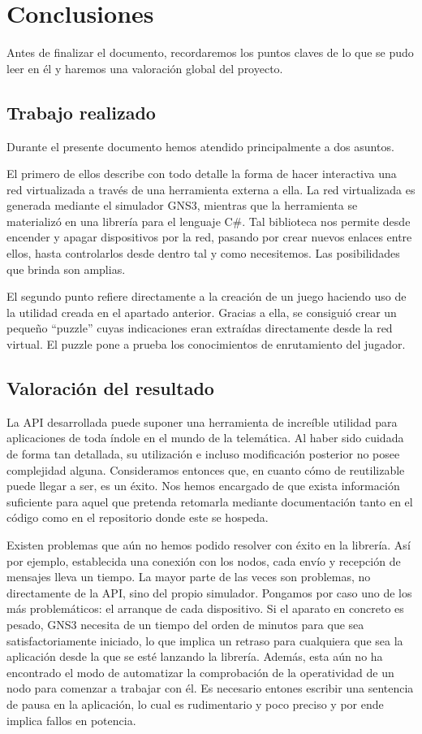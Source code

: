 \chapter{Conclusiones}\label{chap:Conclusiones}
Antes de finalizar el documento, recordaremos los puntos claves de lo que se pudo leer en él y haremos una valoración global del proyecto.

\section{Trabajo realizado}
Durante el presente documento hemos atendido principalmente a dos asuntos.

El primero de ellos describe con todo detalle la forma de hacer interactiva una red virtualizada a través de una herramienta externa a ella. La red virtualizada es generada mediante el simulador GNS3, mientras que la herramienta se materializó en una librería para el lenguaje C\#. Tal biblioteca nos permite desde encender y apagar dispositivos por la red, pasando por crear nuevos enlaces entre ellos, hasta controlarlos desde dentro tal y como necesitemos. Las posibilidades que brinda son amplias.

El segundo punto refiere directamente a la creación de un juego haciendo uso de la utilidad creada en el apartado anterior. Gracias a ella, se consiguió crear un pequeño ``puzzle'' cuyas indicaciones eran extraídas directamente desde la red virtual. El puzzle pone a prueba los conocimientos de enrutamiento del jugador.

\section{Valoración del resultado}
La API desarrollada puede suponer una herramienta de increíble utilidad para aplicaciones de toda índole en el mundo de la telemática. Al haber sido cuidada de forma tan detallada, su utilización e incluso modificación posterior no posee complejidad alguna. Consideramos entonces que, en cuanto cómo de reutilizable puede llegar a ser, es un éxito. Nos hemos encargado de que exista información suficiente para aquel que pretenda retomarla mediante documentación tanto en el código como en el repositorio donde este se hospeda.

Existen problemas que aún no hemos podido resolver con éxito en la librería. Así por ejemplo, establecida una conexión con los nodos, cada envío y recepción de mensajes lleva un tiempo. La mayor parte de las veces son problemas, no directamente de la API, sino del propio simulador. Pongamos por caso uno de los más problemáticos: el arranque de cada dispositivo. Si el aparato en concreto es pesado, GNS3 necesita de un tiempo del orden de minutos para que sea satisfactoriamente iniciado, lo que implica un retraso para cualquiera que sea la aplicación desde la que se esté lanzando la librería. Además, esta aún no ha encontrado el modo de automatizar la comprobación de la operatividad de un nodo para comenzar a trabajar con él. Es necesario entones escribir una sentencia de pausa en la aplicación, lo cual es rudimentario y poco preciso y por ende implica fallos en potencia.

